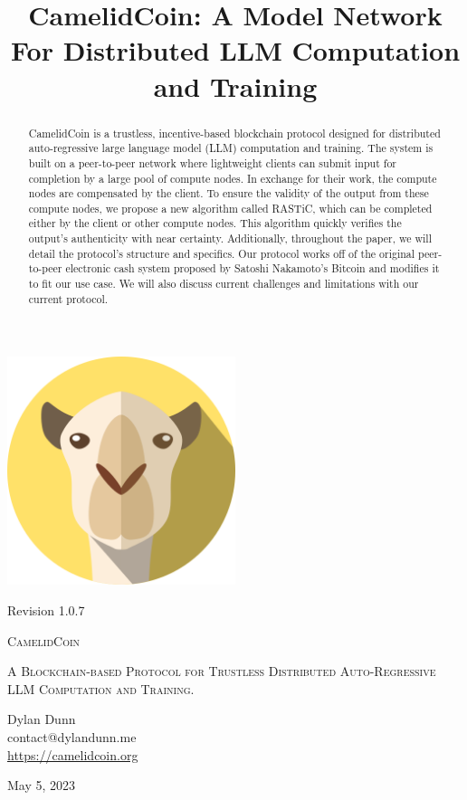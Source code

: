\documentclass{article}
\title{CamelidCoin: A Model Network For Distributed LLM Computation and Training}
\begin{document}

\begin{titlepage}
    \centering
    \includegraphics[width=0.5\textwidth]{logoLarge.png}\par\vspace{.5cm}
    {\small Revision 1.0.7 \\}
    \vspace{1cm}
    {\fontsize{40}{48}\selectfont\scshape CamelidCoin\par}
    \vspace{1cm}
    {\scshape\Large A Blockchain-based Protocol for Trustless Distributed Auto-Regressive LLM Computation and Training. \par}
    \vspace{2cm}
    {\Large Dylan Dunn \\}
    {\Large contact@dylandunn.me \\}
    \vspace{1cm}
    \url{https://camelidcoin.org}
    \vspace{0.5cm}
    \vfill
    {\large May 5, 2023\par}
  \end{titlepage}

\begin{abstract}
CamelidCoin is a trustless, incentive-based blockchain protocol designed for distributed auto-regressive large language model (LLM) computation and training. 
The system is built on a peer-to-peer network where lightweight clients can submit input for completion by a large pool of compute nodes. 
In exchange for their work, the compute nodes are compensated by the client. 
To ensure the validity of the output from these compute nodes, we propose a new algorithm called \ac{RASTiC}, which can be completed either by the client or other compute nodes. 
This algorithm quickly verifies the output's authenticity with near certainty. 
Additionally, throughout the paper, we will detail the protocol's structure and specifics.
Our protocol works off of the original peer-to-peer electronic cash system proposed by Satoshi Nakamoto's Bitcoin and modifies it to fit our use case. 
We will also discuss current challenges and limitations with our current protocol.
\end{abstract}
\end{document}
